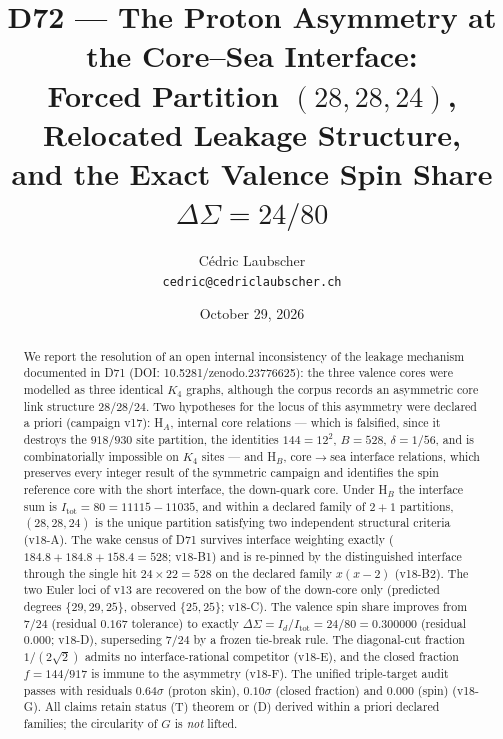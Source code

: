 \documentclass[11pt,a4paper]{article}
\title{D72 --- The Proton Asymmetry at the Core--Sea Interface:\\ Forced Partition $(28,28,24)$, Relocated Leakage Structure,\\ and the Exact Valence Spin Share $\Delta\Sigma = 24/80$}
\author{C\'edric Laubscher\\ \small \texttt{cedric@cedriclaubscher.ch}}
\date{October 29, 2026}
\newcommand{\Itot}{I_{\mathrm{tot}}}
\begin{document}
\maketitle

\begin{abstract}
\noindent We report the resolution of an open internal inconsistency of the leakage mechanism documented in D71 (DOI: 10.5281/zenodo.23776625): the three valence cores were modelled as three identical $K_4$ graphs, although the corpus records an asymmetric core link structure $28/28/24$. Two hypotheses for the locus of this asymmetry were declared a priori (campaign v17): H$_A$, internal core relations --- which is falsified, since it destroys the $918/930$ site partition, the identities $144 = 12^2$, $B = 528$, $\delta = 1/56$, and is combinatorially impossible on $K_4$ sites --- and H$_B$, core$\to$sea interface relations, which preserves every integer result of the symmetric campaign and identifies the spin reference core with the short interface, the down-quark core. Under H$_B$ the interface sum is $\Itot = 80 = 11115 - 11035$, and within a declared family of $2{+}1$ partitions, $(28,28,24)$ is the unique partition satisfying two independent structural criteria (v18-A). The wake census of D71 survives interface weighting exactly ($184.8 + 184.8 + 158.4 = 528$; v18-B1) and is re-pinned by the distinguished interface through the single hit $24 \times 22 = 528$ on the declared family $x(x-2)$ (v18-B2). The two Euler loci of v13 are recovered on the bow of the down-core only (predicted degrees $\{29,29,25\}$, observed $\{25,25\}$; v18-C). The valence spin share improves from $7/24$ (residual $0.167$ tolerance) to exactly $\Delta\Sigma = I_d/\Itot = 24/80 = 0.300000$ (residual $0.000$; v18-D), superseding $7/24$ by a frozen tie-break rule. The diagonal-cut fraction $1/(2\sqrt{2})$ admits no interface-rational competitor (v18-E), and the closed fraction $f = 144/917$ is immune to the asymmetry (v18-F). The unified triple-target audit passes with residuals $0.64\sigma$ (proton skin), $0.10\sigma$ (closed fraction) and $0.000$ (spin) (v18-G). All claims retain status (T) theorem or (D) derived within a priori declared families; the circularity of $G$ is \emph{not} lifted.
\end{abstract}
\end{document}

